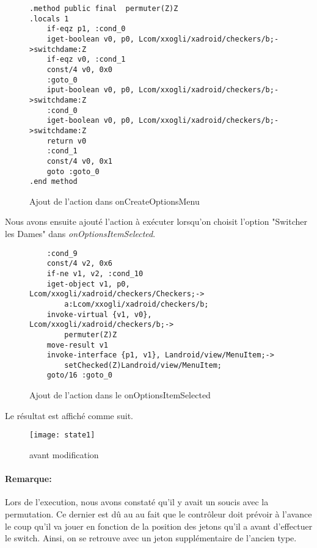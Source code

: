\begin{figure}[!hp]
\begin{verbatim}
.method public final  permuter(Z)Z
.locals 1
    if-eqz p1, :cond_0
    iget-boolean v0, p0, Lcom/xxogli/xadroid/checkers/b;->switchdame:Z
    if-eqz v0, :cond_1
    const/4 v0, 0x0
    :goto_0
    iput-boolean v0, p0, Lcom/xxogli/xadroid/checkers/b;->switchdame:Z
    :cond_0
    iget-boolean v0, p0, Lcom/xxogli/xadroid/checkers/b;->switchdame:Z
    return v0
    :cond_1
    const/4 v0, 0x1
    goto :goto_0
.end method
\end{verbatim}
    \caption{Ajout de l'action dans onCreateOptionsMenu}
\end{figure}

Nous avons ensuite ajouté l'action à exécuter lorsqu'on choisit l'option "Switcher les Dames" dans \textit{onOptionsItemSelected}.

\begin{figure}[!hp]
\begin{verbatim}
    :cond_9
    const/4 v2, 0x6
    if-ne v1, v2, :cond_10
    iget-object v1, p0, Lcom/xxogli/xadroid/checkers/Checkers;->
		a:Lcom/xxogli/xadroid/checkers/b;
    invoke-virtual {v1, v0}, Lcom/xxogli/xadroid/checkers/b;->
		permuter(Z)Z
    move-result v1
    invoke-interface {p1, v1}, Landroid/view/MenuItem;->
		setChecked(Z)Landroid/view/MenuItem;
    goto/16 :goto_0
\end{verbatim}
    \caption{Ajout de l'action dans le onOptionsItemSelected}
\end{figure}

\newpage

Le résultat est affiché comme suit.

\begin{figure}[h!]
	      \begin{center}
			\texttt{[image: state1]}
	      \end{center}
	\caption{avant modification}
\end{figure}


\paragraph{Remarque:}
Lors de l'execution, nous avons constaté qu'il y avait un soucis avec la permutation.
Ce dernier est dû au au fait que le contrôleur doit prévoir à l'avance le coup qu'il va jouer en fonction
de la position des jetons qu'il a avant d'effectuer le switch.
Ainsi, on se retrouve avec un jeton supplémentaire de l'ancien type.

